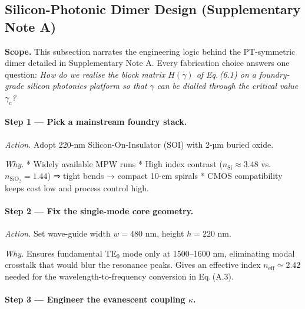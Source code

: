 \documentclass[11pt]{article}
\begin{document}
\subsection{Silicon-Photonic Dimer Design (Supplementary Note A)}
\label{sec:SiliconDimerNarrative}

\noindent
\textbf{Scope.}\;
This subsection narrates the engineering logic behind the
PT-symmetric dimer detailed in Supplementary Note A.  
Every fabrication choice answers one question:  
\emph{How do we realise the block matrix \(H(\gamma)\) of
Eq.\,(6.1) on a foundry-grade silicon photonics platform so that
\(\gamma\) can be dialled through the critical
value \(\gamma_{c}\)?}

\vspace{0.6em}
\paragraph{Step 1 — Pick a mainstream foundry stack.}

\emph{Action.}\;  
Adopt 220-nm Silicon-On-Insulator (SOI) with 2-µm buried oxide.

\emph{Why.}\;  
* Widely available MPW runs  
* High index contrast ($n_{\text{Si}}\approx3.48$ vs.\ $n_{\text{SiO}_2}=1.44$)  
  ⇒ tight bends → compact 10-cm spirals  
* CMOS compatibility keeps cost low and process control high.

\vspace{0.4em}
\paragraph{Step 2 — Fix the single-mode core geometry.}

\emph{Action.}\;  
Set wave-guide width \(w=480\) nm, height \(h=220\) nm.

\emph{Why.}\;  
Ensures fundamental TE\(_0\) mode only at 1500–1600 nm, eliminating
modal crosstalk that would blur the resonance peaks.
Gives an effective index
\(n_{\text{eff}}\simeq2.42\) needed for the wavelength-to-frequency
conversion in Eq.\,(A.3).

\vspace{0.4em}
\paragraph{Step 3 — Engineer the evanescent coupling \(\kappa\).}
\end{document}
